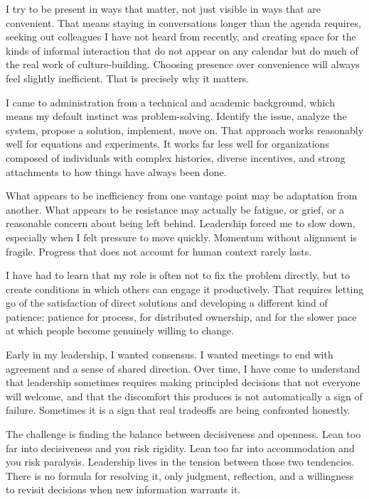 \documentclass[10pt]{article}
\begin{document}
I try to be present in ways that matter, not just visible in ways that are convenient. That
means staying in conversations longer than the agenda requires, seeking out colleagues I have
not heard from recently, and creating space for the kinds of informal interaction that do not
appear on any calendar but do much of the real work of culture-building. Choosing presence over
convenience will always feel slightly inefficient. That is precisely why it matters.


I came to administration from a technical and academic background, which means my default
instinct was problem-solving. Identify the issue, analyze the system, propose a solution,
implement, move on. That approach works reasonably well for equations and experiments. It works
far less well for organizations composed of individuals with complex histories, diverse
incentives, and strong attachments to how things have always been done.

What appears to be inefficiency from one vantage point may be adaptation from another. What
appears to be resistance may actually be fatigue, or grief, or a reasonable concern about being
left behind. Leadership forced me to slow down, especially when I felt pressure to move
quickly. Momentum without alignment is fragile. Progress that does not account for human
context rarely lasts.

I have had to learn that my role is often not to fix the problem directly, but to create
conditions in which others can engage it productively. That requires letting go of the
satisfaction of direct solutions and developing a different kind of patience: patience for
process, for distributed ownership, and for the slower pace at which people become genuinely
willing to change.


Early in my leadership, I wanted consensus. I wanted meetings to end with agreement and a sense
of shared direction. Over time, I have come to understand that leadership sometimes requires
making principled decisions that not everyone will welcome, and that the discomfort this
produces is not automatically a sign of failure. Sometimes it is a sign that real tradeoffs are
being confronted honestly.

The challenge is finding the balance between decisiveness and openness. Lean too far into
decisiveness and you risk rigidity. Lean too far into accommodation and you risk paralysis.
Leadership lives in the tension between those two tendencies. There is no formula for resolving
it, only judgment, reflection, and a willingness to revisit decisions when new information
warrants it.
\end{document}
